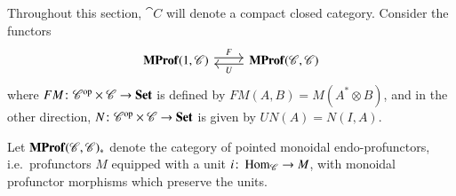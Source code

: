 \documentclass[12pt,oneside,article,draft]{memoir}
\begin{document}
Throughout this section, $\cat{C}$ will denote a compact closed category.
Consider the functors
\begin{equation}\label{eqn:functors 1C CC}
\begin{tikzcd}
	\MProf(1,\cat{C}) \ar[r,shift left,"F"]
	& \MProf(\cat{C},\cat{C}) \ar[l,shift left,"U"]
\end{tikzcd}
\end{equation}
where $FM\colon{\mathscr{C}}^{\text{op}}\times\mathscr{C}\to\mathbf{Set}$ is defined by $FM(A,B)=M(A^*\otimes B)$, and in the other direction, $N\colon{\mathscr{C}}^{\text{op}}\times\mathscr{C}\to\mathbf{Set}$ is given by $UN(A)=N(I,A)$.

Let $\mathbf{MProf}(\mathscr{C},\mathscr{C})_{\ast}$ denote the category of pointed monoidal endo-profunctors, i.e.~profunctors $M$ equipped with a unit $i\colon\operatorname{Hom}_{\mathscr{C}}\to M$, with monoidal profunctor morphisms which preserve the units.
\end{document}

